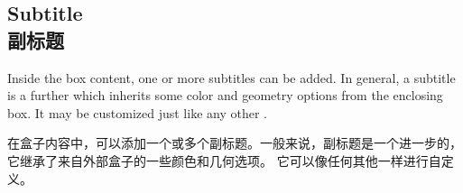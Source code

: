 \setcounter{section}{4}
\setcounter{subsection}{1}
\setcounter{subsubsection}{0}

\subsection{Subtitle\\副标题}

Inside the box content, one or more subtitles can be added.
In general, a subtitle is a further  which inherits some color and geometry options from the enclosing box. 
It may be customized just like any other .


在盒子内容中，可以添加一个或多个副标题。一般来说，副标题是一个进一步的，它继承了来自外部盒子的一些颜色和几何选项。%
它可以像任何其他一样进行自定义。




